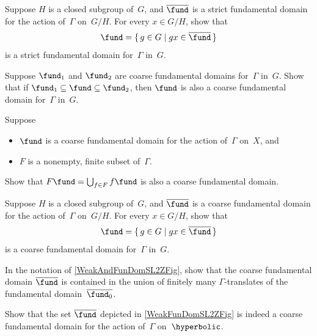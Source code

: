 \begin{exercises}

\item \label{FundInX->FundInG}
Suppose $H$ is a closed subgroup of~$G$, and $\overline{\fund}$ is a strict fundamental domain for the action of~$\Gamma$ on~$G/H$. For every $x \in G/H$, show that
	$$ \fund = \{\, g \in G \mid gx \in \overline{\fund}\,\} $$
is a strict fundamental domain for~$\Gamma$ in~$G$.

\item \label{F1inFinF2}
Suppose $\fund_1$ and $\fund_2$ are coarse fundamental domains for~$\Gamma$ in~$G$. Show that if $\fund_1 \subseteq \fund \subseteq \fund_2$, then $\fund$ is also a coarse fundamental domain for~$\Gamma$ in~$G$.

\item \label{FinUnionFundDomsIsWeak}
Suppose 
	\begin{itemize}
	\item $\fund$ is a coarse fundamental domain for the action of~$\Gamma$ on~$X$, 
	and
	\item  $F$ is a nonempty, finite subset of~$\Gamma$.
	\end{itemize}
Show that $F \fund = \bigcup_{f \in F} f \fund$ is also a coarse fundamental domain.

\item \label{CoarseInX->CoarseInG}
Suppose $H$ is a closed subgroup of~$G$, and $\overline{\fund}$ is a coarse fundamental domain for the action of~$\Gamma$ on~$G/H$. For every $x \in G/H$, show that
	$$ \fund = \{\, g \in G \mid gx \in \overline{\fund}\,\} $$
is a coarse fundamental domain for~$\Gamma$ in~$G$.

\item \label{FCoveredByF0}
In the notation of \cref{WeakAndFunDomSL2ZFig}, show that the coarse fundamental domain $\overline{\fund}$ is contained in the union of finitely many $\Gamma$-translates of the fundamental domain~$\overline{\fund_0}$.

\item \label{FIsWeakFundDom}
Show that the set $\overline{\fund}$ depicted in \cref{WeakFunDomSL2ZFig} is indeed a coarse fundamental domain for the action of~$\Gamma$ on~$\hyperbolic$. 


\end{exercises}
